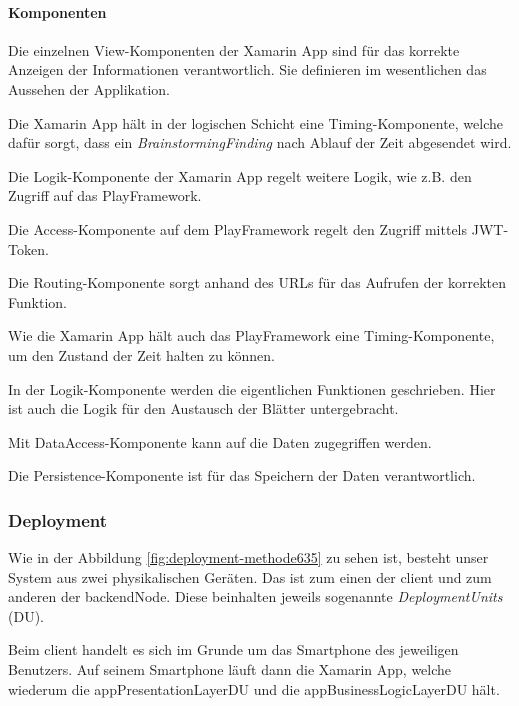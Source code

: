 \paragraph*{Komponenten}

\begin{description}[leftmargin=!,labelwidth=\widthof{\bfseries DataAccessComponent}]
	\item[ViewComponent] Die einzelnen View-Komponenten der Xamarin App sind für das korrekte Anzeigen der Informationen verantwortlich. Sie definieren im wesentlichen das Aussehen der Applikation.
	\item[AppTimingComponent] Die Xamarin App hält in der logischen Schicht eine Timing-Komponente, welche dafür sorgt, dass ein \textit{BrainstormingFinding} nach Ablauf der Zeit abgesendet wird.
	\item[AppLogicComponent] Die Logik-Komponente der Xamarin App regelt weitere Logik, wie z.B. den Zugriff auf das PlayFramework.
	\item[AccessComponent] Die Access-Komponente auf dem PlayFramework regelt den Zugriff mittels JWT-Token\cite{jwt}.
	\item[Routing] Die Routing-Komponente sorgt anhand des URLs für das Aufrufen der korrekten Funktion.
	\item[TimingComponent] Wie die Xamarin App hält auch das PlayFramework eine Timing-Komponente, um den Zustand der Zeit halten zu können.
	\item[LogicComponent] In der Logik-Komponente werden die eigentlichen Funktionen geschrieben. Hier ist auch die Logik für den Austausch der Blätter untergebracht.
	\item[DataAccessComponent] Mit DataAccess-Komponente kann auf die Daten zugegriffen werden.
	\item[PersistenceComponent] Die Persistence-Komponente ist für das Speichern der Daten verantwortlich.
\end{description}


\subsubsection{Deployment}
Wie in der Abbildung \ref{fig:deployment-methode635} zu sehen ist, besteht unser System aus zwei physikalischen Geräten. Das ist zum einen der client und zum anderen der backendNode. Diese beinhalten jeweils sogenannte \textit{DeploymentUnits} (DU). 

Beim client handelt es sich im Grunde um das Smartphone des jeweiligen Benutzers. Auf seinem Smartphone läuft dann die Xamarin App, welche wiederum die appPresentationLayerDU und die appBusinessLogicLayerDU hält.

